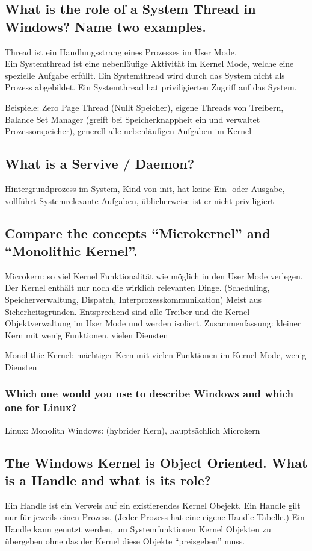\subsection{What is the role of a System Thread in Windows? Name two examples.}
Thread ist ein Handlungsstrang eines Prozesses im User Mode. \\
Ein Systemthread ist eine nebenläufige Aktivität im Kernel Mode, welche eine spezielle Aufgabe erfüllt.
Ein Systemthread wird durch das System nicht als Prozess abgebildet.
Ein Systemthread hat priviligierten Zugriff auf das System.

Beispiele: Zero Page Thread (Nullt Speicher), eigene Threads von Treibern, Balance Set Manager (greift bei Speicherknappheit ein und verwaltet Prozessorspeicher), generell alle nebenläufigen Aufgaben im Kernel

\subsection{What is a Servive / Daemon?}
Hintergrundprozess im System, Kind von init, hat keine Ein- oder Ausgabe, vollführt Systemrelevante Aufgaben, üblicherweise ist er nicht-priviligiert

\subsection{Compare the concepts ``Microkernel'' and ``Monolithic Kernel''.}
Microkern: so viel Kernel Funktionalität wie möglich in den User Mode verlegen.
Der Kernel enthält nur noch die wirklich relevanten Dinge. (Scheduling, Speicherverwaltung, Dispatch, Interprozesskommunikation)
Meist aus Sicherheitsgründen.
Entsprechend sind alle Treiber und die Kernel-Objektverwaltung im User Mode und werden isoliert.
Zusammenfassung: kleiner Kern mit wenig Funktionen, vielen Diensten

Monolithic Kernel: mächtiger Kern mit vielen Funktionen im Kernel Mode, wenig Diensten

\subsubsection{Which one would you use to describe Windows and which one for Linux?}
Linux: Monolith
Windows: (hybrider Kern), hauptsächlich Microkern

\subsection{The Windows Kernel is Object Oriented. What is a Handle and what is its role?}
Ein Handle ist ein Verweis auf ein existierendes Kernel Obejekt.
Ein Handle gilt nur für jeweils einen Prozess. (Jeder Prozess hat eine eigene Handle Tabelle.)
Ein Handle kann genutzt werden, um Systemfunktionen Kernel Objekten zu übergeben ohne das der Kernel diese Objekte ``preisgeben'' muss.

